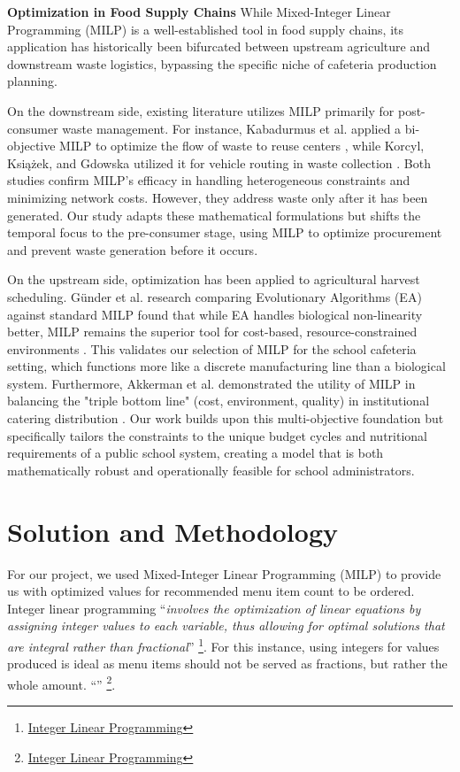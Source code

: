 \documentclass{scrartcl}
\begin{document}
\textbf{Optimization in Food Supply Chains}
While Mixed-Integer Linear Programming (MILP) is a well-established tool in food supply chains, its application has historically been bifurcated between upstream agriculture and downstream waste logistics, bypassing the specific niche of cafeteria production planning.

On the downstream side, existing literature utilizes MILP primarily for post-consumer waste management. For instance, Kabadurmus et al. applied a bi-objective MILP to optimize the flow of waste to reuse centers \cite{kabadurmus}, while Korcyl, Ksi{\k{a}}{\.z}ek, and Gdowska utilized it for vehicle routing in waste collection \cite{korcyl}. Both studies confirm MILP’s efficacy in handling heterogeneous constraints and minimizing network costs. However, they address waste only after it has been generated. Our study adapts these mathematical formulations but shifts the temporal focus to the pre-consumer stage, using MILP to optimize procurement and prevent waste generation before it occurs.

On the upstream side, optimization has been applied to agricultural harvest scheduling. G{\"u}nder et al. research comparing Evolutionary Algorithms (EA) against standard MILP found that while EA handles biological non-linearity better, MILP remains the superior tool for cost-based, resource-constrained environments \cite{gunder}. This validates our selection of MILP for the school cafeteria setting, which functions more like a discrete manufacturing line than a biological system. Furthermore, Akkerman et al. demonstrated the utility of MILP in balancing the "triple bottom line" (cost, environment, quality) in institutional catering distribution \cite{akkerman}. Our work builds upon this multi-objective foundation but specifically tailors the constraints to the unique budget cycles and nutritional requirements of a public school system, creating a model that is both mathematically robust and operationally feasible for school administrators.


\section{Solution and Methodology}

For our project, we used Mixed-Integer Linear Programming (MILP) to provide us with optimized values for recommended menu item count to be ordered. Integer linear programming “\textit{involves the optimization of linear equations by assigning integer values to each variable, thus allowing for optimal solutions that are integral rather than fractional}” \footnote{\href{https://www.complexica.com/narrow-ai-glossary/integer-programming}{Integer Linear Programming}}. For this instance, using integers for values produced is ideal as menu items should not be served as fractions, but rather the whole amount. “” \footnote{\href{https://www.complexica.com/narrow-ai-glossary/integer-programming}{Integer Linear Programming}}.
\end{document}
